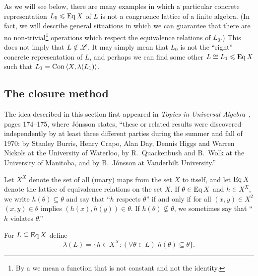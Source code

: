 As we will see below, there are many examples in which a particular concrete
representation $L_0\leqslant \operatorname{Eq} X$ of $L$ is not a congruence lattice of a
finite algebra.  (In fact, we will describe general situations in which we can
guarantee that there are no non-trivial\footnote{By a 
   we mean a function that is
  not constant and not the identity.} operations which respect the equivalence
relations of $L_0$.)  This does not imply that $L \notin \mathscr{L}$.  It may
simply mean that $L_0$ is not the ``right'' concrete representation of $L$, and
perhaps we can find some other $L \cong L_1\leqslant \operatorname{Eq} X$ such that $L_1 = \operatorname{Con\,}
\langle X, \lambda(L_1)\rangle$.

\subsection{The closure method}
\label{sec:closure-method}
The idea described in this section
first appeared in \emph{Topics in Universal Algebra}~\cite{Jonsson:1972}, pages
174--175, where J\'onsson states, ``these or related results were discovered
independently by at least three different parties during the summer and fall of
1970: by Stanley Burris, Henry Crapo, Alan Day, Dennis Higgs and Warren Nickols
at the University of Waterloo, by R.~Quackenbush and B.~Wolk at the University
of Manitoba, and by B.~J\'{o}nsson at Vanderbilt University.''

Let $X^X$ denote the set of all (unary) maps from the set $X$ to itself, and let 
$\operatorname{Eq} X$ denote the lattice of equivalence relations on the set $X$.  If $\theta
\in \operatorname{Eq} X$ and $h\in X^X$, we write $h(\theta) \subseteq \theta$ and say
that ``$h$ respects $\theta$'' if and only if for all $(x,y)\in X^2$ $(x,y)\in
\theta$ implies 
$(h(x),h(y)) \in \theta$.  If $h(\theta) \nsubseteq \theta$, we sometimes say
that ``$h$ violates $\theta$.''

For $L\subseteq \operatorname{Eq} X$ define
\[
\lambda(L) = \{h\in X^X: (\forall \theta \in L) \; h(\theta) \subseteq \theta \}.
\]

